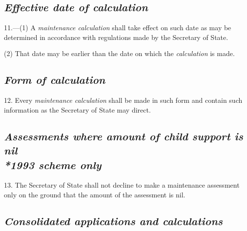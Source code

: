 \documentclass[12pt,a4paper]{article}
\begin{document}
\subsection*{\itshape Effective date of 
\emph{calculation}  %
}

11.---(1) A 
\emph{maintenance calculation}  %
shall take effect on such date as may be determined in accordance with regulations made by the Secretary of State.

(2) That date may be earlier than the date on which the 
\emph{calculation}  %
is made.


\subsection*{\itshape Form of 
\emph{calculation}  %
}

12. Every 
\emph{maintenance calculation}  %
shall be made in such form and contain such information as the Secretary of State may direct.

\subsection*{\itshape Assessments where amount of child support is nil\\*\emph{1993 scheme only}}

13.
The Secretary of State%
shall not decline to make a maintenance assessment only on the ground that the amount of the assessment is nil.


\subsection*{\itshape Consolidated applications and 
\emph{calculations}  %
}
\end{document}
